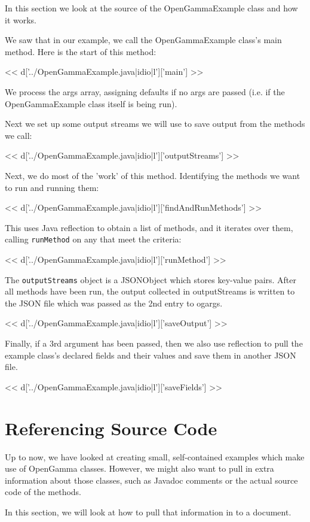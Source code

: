 In this section we look at the source of the OpenGammaExample class and how it
works.

We saw that in our example, we call the OpenGammaExample class's main method.
Here is the start of this method:

<< d['../OpenGammaExample.java|idio|l']['main'] >>

We process the args array, assigning defaults if no args are passed (i.e. if
the OpenGammaExample class itself is being run).

Next we set up some output streams we will use to save output from the methods
we call:

<< d['../OpenGammaExample.java|idio|l']['outputStreams'] >>

Next, we do most of the 'work' of this method. Identifying the methods we want
to run and running them:

<< d['../OpenGammaExample.java|idio|l']['findAndRunMethods'] >>

This uses Java reflection to obtain a list of methods, and it iterates over
them, calling \verb|runMethod| on any that meet the criteria:

<< d['../OpenGammaExample.java|idio|l']['runMethod'] >>

The \verb|outputStreams| object is a JSONObject which stores key-value pairs.
After all methods have been run, the output collected in outputStreams is
written to the JSON file which was passed as the 2nd entry to ogargs.

<< d['../OpenGammaExample.java|idio|l']['saveOutput'] >>

Finally, if a 3rd argument has been passed, then we also use reflection to pull
the example class's declared fields and their values and save them in another
JSON file.

<< d['../OpenGammaExample.java|idio|l']['saveFields'] >>

\section{Referencing Source Code}

Up to now, we have looked at creating small, self-contained examples
which make use of OpenGamma classes. However, we might also want to pull in
extra information about those classes, such as Javadoc comments or the actual
source code of the methods.

In this section, we will look at how to pull that information in to a document.

